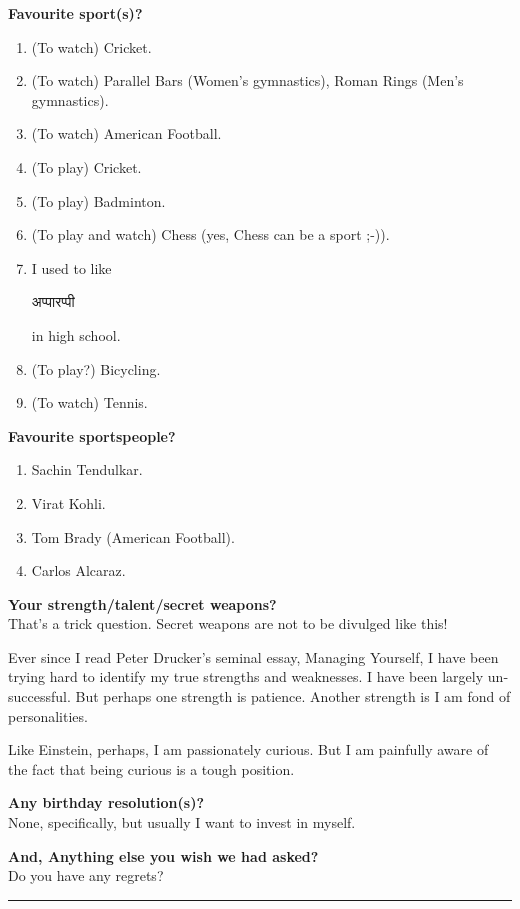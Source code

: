 \documentclass[17pt]{extarticle}  %
\begin{document}
\begin{enumerate}
\begin{english}
\item\textbf{Favourite sport(s)?}\\
\begin{enumerate}
\item (To watch) Cricket.
\item (To watch) Parallel Bars (Women's gymnastics), Roman Rings (Men's gymnastics).
\item (To watch) American Football.
\item (To play) Cricket.
\item (To play) Badminton.
\item (To play and watch) Chess (yes, Chess can be a sport ;-)).
\item I used to like \begin{marathi}अप्पारप्पी\end{marathi} in high school.
\item (To play?) Bicycling.
\item (To watch) Tennis.
\end{enumerate}

\item\textbf{Favourite sportspeople?}\\
\begin{enumerate}
\item Sachin Tendulkar.
\item Virat Kohli.
\item Tom Brady (American Football).
\item Carlos Alcaraz.
\end{enumerate}


\item\textbf{Your strength/talent/secret weapons?}\\

That's a trick question. Secret weapons are not to be divulged like this! 

Ever since I read Peter Drucker's seminal essay, Managing Yourself, I have been trying hard to identify my true strengths and weaknesses. I have been largely unsuccessful. But perhaps one strength is patience. Another strength is I am fond of personalities.

Like Einstein, perhaps, I am passionately curious. But I am painfully aware of the fact that being curious is a tough position.

\item\textbf{Any birthday resolution(s)?}\\

None, specifically, but usually I want to invest in myself.

\item\textbf{And, Anything else you wish we had asked?}\\

Do you have any regrets?
\end{english}
\end{enumerate}
\vspace{5mm}
\hrule
\end{document}
